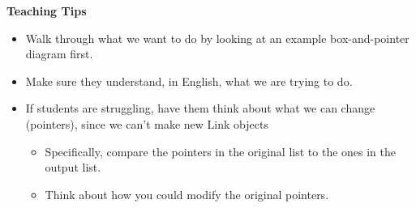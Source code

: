 \begin{blocksection}
\begin{guide}
    \textbf{Teaching Tips}
    \begin{itemize}
       \item Walk through what we want to do by looking at an example box-and-pointer diagram first.
       \item Make sure they understand, in English, what we are trying to do.
       \item If students are struggling, have them think about what we can change (pointers), since we can't make new Link objects
       \begin{itemize}
           \item Specifically, compare the pointers in the original list to the ones in the output list.
           \item Think about how you could modify the original pointers.
       \end{itemize}
    \end{itemize}
 \end{guide}
\end{blocksection}
